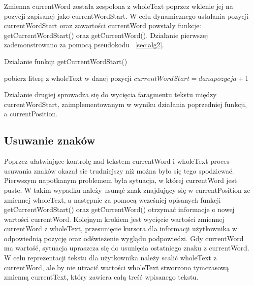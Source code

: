 \documentclass[twoside,a4paper]{book}
\begin{document}
Zmienna currentWord została zespolona z wholeText poprzez wklenie jej na pozycji zapisanej jako currentWordStart. 
W celu dynamicznego ustalania pozycji currentWordStart oraz zawartości currentWord powstały funkcje: getCurrentWordStart() oraz getCurrentWord(). Działanie pierwszej zademonstrowano za pomocą pseudokodu ~\ref{sec:alg2}.
\begin{algorithm}
\caption{Działanie funkcji getCurrentWordStart()}
\label{sec:alg2}
\begin{algorithmic}
\STATE pobierz literę z wholeText w danej pozycji
\STATE $currentWordStart = dana pozycja + 1$
\ENDIF
\ENDFOR
\ENDIF
\end{algorithmic}
\end{algorithm}
Działanie drugiej sprowadza się do wycięcia faragmentu tekstu między currentWordStart, zaimplementowanym w wyniku działania poprzedniej funkcji, a currentPosition.
\subsection{Usuwanie znaków} \label{sec:backspc}
Poprzez ułatwiające kontrolę nad tekstem currentWord i wholeText proces usuwania znaków okazał sie trudniejszy niż można było się tego spodziewać. Pier\-wszym napotkanym problemem była sytuacja, w której currentWord jest puste. W takim wypadku należy usunąć znak znajdujący się w currentPosition ze zmie\-nnej wholeText, a następnie za pomocą wcześniej opisanych funkcji getCurrentWordStart() oraz getCurrentWord() otrzymać informacje o nowej wartości currentWord. Kolejnym krokiem jest wycięcie wartości zmiennej currentWord z wholeText, przesunięcie kursora dla informacji użytkownika w odpowiednią pozycję oraz odświeżenie wyglądu podpowiedzi.
Gdy currentWord ma wartość, sytuacja upraszcza się do usunięcia ostatniego znaku z currentWord. W celu reprezentacji tekstu dla użytkownika należy scalić wholeText z currentWord, ale by nie utracić wartości wholeText stworzono tymczasową zmienną currentText, który zawiera całą treść wpisanego tekstu.
\end{document}
